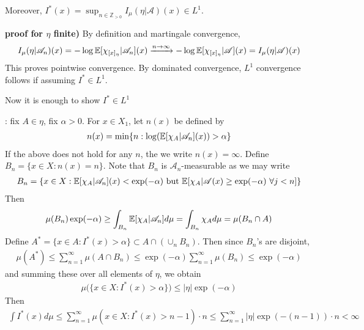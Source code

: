 \documentclass[10pt,a4paper]{report}
\newenvironment{proof}
{\begin{changemargin}{1cm}{0.5cm} 
	}%
	{\end{changemargin}
}
\newenvironment{subproof}
{\begin{changemargin}{0.5cm}{0.5cm}
	}%
	{\end{changemargin}
}
\begin{document}
\quad Moreover, $I^*(x) = \sup_{n\in \mathbb{Z}_{>0}}I_{\mu}(\eta | \mathscr{A}) (x) \in L^1$.
\begin{proof}
\textbf{proof for $\eta$ finite)} By definition and martingale convergence,
\begin{align*}
I_{\mu}(\eta | \mathscr{A}_n)(x) = -\log \mathbb{E} [ \chi_{[x]_{\eta}} | \mathscr{A}_n ](x) \xrightarrow{n\rightarrow \infty} -\log \mathbb{E} [ \chi_{[x]_{\eta}} | \mathscr{A}](x) = I_{\mu}(\eta | \mathscr{A})(x)
\end{align*}
This proves pointwise convergence. By dominated convergence, $L^1$ convergence follows if assuming $I^* \in L^1$.

\quad Now it is enough to show $I^* \in L^1$
\begin{subproof}
: fix $A \in \eta$, fix $\alpha>0$. For $x\in X_1$, let $n(x)$ be defined by
\begin{align*}
n(x) = \min \{ n : \log (\mathbb{E}[\chi_A | \mathscr{A}_n](x)) > \alpha \}
\end{align*}
If the above does not hold for any $n$, the we write $n(x) = \infty$. Define $B_n = \{ x\in X : n(x) =n \}$. Note that $B_n$ is $\mathscr{A}_n$-measurable as we may write
\begin{align*}
B_n = \{ x\in X : \mathbb{E}[\chi_A | \mathscr{A}_n](x) < \exp(-\alpha) \text{ but } \mathbb{E}[\chi_A |\mathscr{A}(x) \geq \exp(-\alpha) \,\, \forall j<n ] \}
\end{align*}
Then
\begin{align*}
\mu(B_n) \exp(-\alpha) \geq \int_{B_n} \mathbb{E}[\chi_A | \mathscr{A}_n] d\mu = \int_{B_n} \chi_A d\mu = \mu(B_n \cap A)
\end{align*}
Define $A^* = \{ x\in A : I^*(x) > \alpha \} \subset A \cap (\cup_n B_n)$. Then since $B_n$'s are disjoint,
\begin{align*}
\mu(A^*) \leq \sum_{n=1}^{\infty} \mu(A\cap B_n) \leq \exp(-\alpha) \sum_{n=1}^{\infty} \mu(B_n) \leq \exp(-\alpha)
\end{align*}
and summing these over all elements of $\eta$, we obtain
\begin{align*}
\mu \big( \{ x\in X : I^*(x) > \alpha \} \big) \leq |\eta| \exp(-\alpha)
\end{align*}
Then
\begin{align*}
\int I^*(x) d\mu \leq \sum_{n=1}^{\infty} \mu(x\in X : I^*(x) > n-1) \cdot n \leq \sum_{n=1}^{\infty} |\eta| \exp(-(n-1))\cdot n < \infty
\end{align*}
\end{subproof}

\eop
\end{proof}
\s
\end{document}
